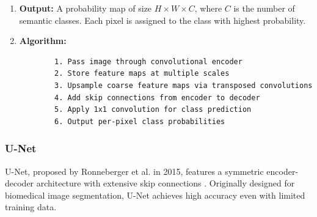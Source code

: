 \documentclass[conference]{IEEEtran}
\begin{document}
\begin{enumerate}
	\item \textbf{Output:}
	A probability map of size $H \times W \times C$, where $C$ is the number of semantic classes. Each pixel is assigned to the class with highest probability.
	
	\item \textbf{Algorithm:}
	\begin{lstlisting}
		1. Pass image through convolutional encoder
		2. Store feature maps at multiple scales
		3. Upsample coarse feature maps via transposed convolutions
		4. Add skip connections from encoder to decoder
		5. Apply 1x1 convolution for class prediction
		6. Output per-pixel class probabilities
	\end{lstlisting}
\end{enumerate}

\subsubsection{U-Net}
U-Net, proposed by Ronneberger et al. in 2015, features a symmetric encoder-decoder architecture with extensive skip connections \cite{ronneberger2015unet}. Originally designed for biomedical image segmentation, U-Net achieves high accuracy even with limited training data.
\end{document}
